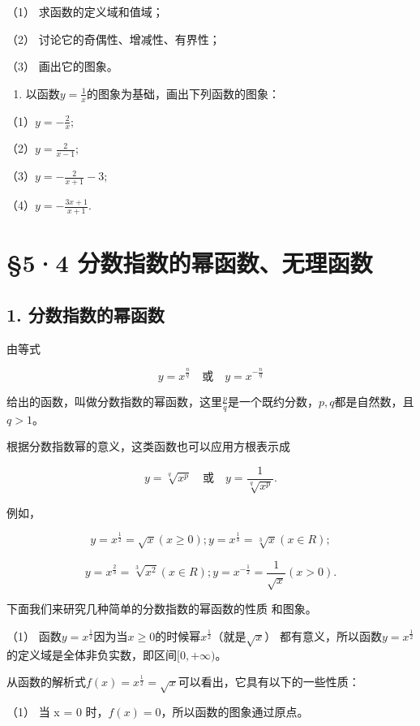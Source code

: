 （1） 求函数的定义域和值域；

（2） 讨论它的奇偶性、增减性、有界性；

（3） 画出它的图象。

\begin{enumerate}[start=2]
\item
  以函数\(y = \frac{1}{x}\)的图象为基础，画出下列函数的图象：
\end{enumerate}

（1）\(y = -\frac{2}{x};\)

（2）\(y = \frac{2}{x - 1};\)

（3）\(y = -\frac{2}{x + 1} - 3;\)

（4）\(y = -\frac{3x + 1}{x + 1}.\)

\section{§5·4 分数指数的幂函数、无理函数}

\subsection{1. 分数指数的幂函数}

由等式

\[
y = x^{\frac{n}{q}} \quad \text{或} \quad y = x^{- \frac{n}{q}}
\]

给出的函数，叫做分数指数的幂函数，这里\(\frac{p}{q}\)是一个既约分数，\(p, q\)都是自然数，且\(q > 1\)。

根据分数指数幂的意义，这类函数也可以应用方根表示成

\[
y = \sqrt[q]{x^{p}} \quad \text{或} \quad y = \frac{1}{\sqrt[q]{x^{p}}}.
\]

例如，

\[
y = x^{\frac{1}{2}} = \sqrt{x} (x \geqslant 0); y = x^{\frac{1}{3}} = \sqrt[3]{x} (x \in R);
\]

\[
y = x^{\frac{2}{3}} = \sqrt[3]{x^{2}} (x \in R); y = x^{- \frac{1}{2}} = \frac{1}{\sqrt{x}} (x > 0).
\]

下面我们来研究几种简单的分数指数的幂函数的性质 和图象。

（1）
函数\(y = x^{\frac{1}{2}}\)因为当\(x \geqslant 0\)的时候幂\(x^{\frac{1}{2}}\)（就是\(\sqrt{x}\)）
都有意义，所以函数\(y=x^{\frac{1}{2}}\)的定义域是全体非负实数，即区间\([0, +\infty)\)。

从函数的解析式\(f(x)=x^{\frac{1}{2}}=\sqrt{x}\)可以看出，它具有以下的一些性质：

（1） 当 x = 0 时，\(f(x) = 0\)，所以函数的图象通过原点。

